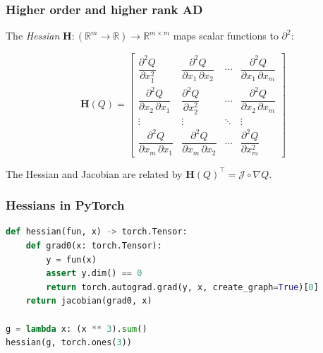 \documentclass{beamer}
\begin{document}
    \begin{frame}
        \frametitle{Higher order and higher rank AD}

        The \textit{Hessian} $\mathbf{H}:(\mathbb{R}^m\rightarrow\mathbb{R})\rightarrow\mathbb{R}^{m\times m}$ maps scalar functions to $\partial^2$:

        \begin{equation*}
            \mathbf{H}(Q) = \begin{bmatrix}{\dfrac {\partial ^{2}Q}{\partial x_{1}^{2}}}&{\dfrac {\partial ^{2}Q}{\partial x_{1}\,\partial x_{2}}}&\cdots &{\dfrac {\partial ^{2}Q}{\partial x_{1}\,\partial x_{m}}}\\[2.2ex]{\dfrac {\partial ^{2}Q}{\partial x_{2}\,\partial x_{1}}}&{\dfrac {\partial ^{2}Q}{\partial x_{2}^{2}}}&\cdots &{\dfrac {\partial ^{2}Q}{\partial x_{2}\,\partial x_{m}}}\\[2.2ex]\vdots &\vdots &\ddots &\vdots \\[2.2ex]{\dfrac {\partial ^{2}Q}{\partial x_{m}\,\partial x_{1}}}&{\dfrac {\partial ^{2}Q}{\partial x_{m}\,\partial x_{2}}}&\cdots &{\dfrac {\partial ^{2}Q}{\partial x_{m}^{2}}}\end{bmatrix}
        \end{equation*}

        The Hessian and Jacobian are related by $\mathbf{H}(Q)^\intercal = \mathcal{J} \circ \nabla Q$.
    \end{frame}

    \begin{frame}[fragile]
        \frametitle{Hessians in PyTorch}
        \begin{lstlisting}[language=Python]
def hessian(fun, x) -> torch.Tensor:
    def grad0(x: torch.Tensor):
        y = fun(x)
        assert y.dim() == 0
        return torch.autograd.grad(y, x, create_graph=True)[0]
    return jacobian(grad0, x)

g = lambda x: (x ** 3).sum()
hessian(g, torch.ones(3))
        \end{lstlisting}
    \end{frame}
\end{document}
